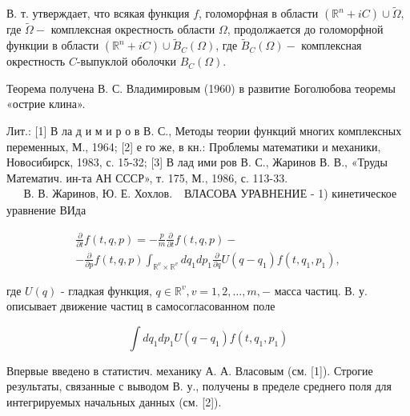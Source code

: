 \documentclass[10pt]{article}
\begin{document}
В. т. утверждает, что всякая функция $f$, голоморфная в области $\left(\mathbb{R}^{n}+i C\right) \cup \widetilde{\Omega}$, где $\widetilde{\Omega}-$ комплексная окрестность области $\Omega$, продолжается до голоморфной функции в области $\left(\mathbb{R}^{n}+i C\right) \cup \widetilde{B}_{C}(\Omega)$, где $\widetilde{B}_{C}(\Omega)-$ комплексная окрестность $C$-выпуклой оболочки $B_{C}(\Omega)$.



Теорема получена В. С. Владимировым (1960) в развитие Боголюбова теоремы «острие клина».



Лит.: [1] В ла д и м и р о в В. С., Методы теории функций многих комплексных переменных, М., 1964; [2] е го же, в кн.: Проблемы математики и механики, Новосибирск, 1983, с. 15-32; [3] В лад ими ров В. С., Жаринов В. В., «Труды Математич. ин-та АН СССР», т. 175, М., 1986, с. 113-33. $\begin{aligned} & \text { В. В. Жаринов, Ю. Е. Хохлов. }\end{aligned}$ ВЛАСОВА УРАВНЕНИЕ - 1) кинетическое уравнение ВИда



\[

\begin{gathered}

\frac{\partial}{\partial t} f(t, q, p)=-\frac{p}{m} \frac{\partial}{\partial t} f(t, q, p)- \\

-\frac{\partial}{\partial p} f(t, q, p) \int_{\mathbb{R}^{v} \times \mathbb{R}^{v}} d q_{1} d p_{1} \frac{\partial}{\partial q} U\left(q-q_{1}\right) f\left(t, q_{1}, p_{1}\right),

\end{gathered}

\]



где $U(q)$ - гладкая функция, $q \in \mathbb{R}^{v}, v=1,2, \ldots, m,-$ масса частиц. В. у. описывает движение частиц в самосогласованном поле



\[

\int d q_{1} d p_{1} U\left(q-q_{1}\right) f\left(t, q_{1}, p_{1}\right)

\]



Впервые введено в статистич. механику А. А. Власовым (см. [1]). Строгие результаты, связанные с выводом В. у., получены в пределе среднего поля для интегрируемых начальных данных (см. [2]).
\end{document}
